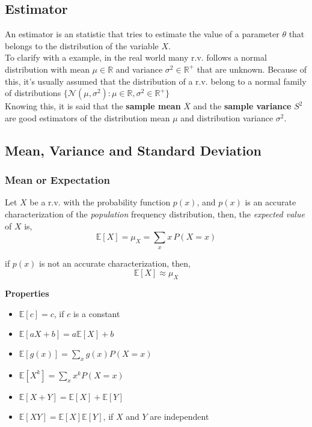 \subsection{Estimator}
An estimator is an statistic that tries to estimate the value of a parameter $\theta$ that belongs to the distribution of the variable
$X$.\\

To clarify with a example, in the real world many r.v. follows a normal distribution with mean $\mu \in \mathbb{R}$ and variance 
$\sigma^2 \in \mathbb{R}^+$ that are unknown. Because of this, it's usually assumed that the distribution of a r.v. belong to a 
normal family of distributions $\{\mathcal{N}(\mu,\sigma^2):\mu\in\mathbb{R},\sigma^2\in \mathbb{R^+} \}$\\

Knowing this, it is said that the \textbf{sample mean} $\overline{X}$ and the \textbf{sample variance} $S^2$ are good estimators of 
the distribution mean $\mu$ and distribution variance $\sigma^2$.

\subsection{Mean, Variance and Standard Deviation}
\subsubsection{Mean or Expectation}
Let $X$ be a r.v. with the probability function $p(x)$, and $p(x)$ is an accurate characterization of the \textit{population} frequency distribution,
then, the \textit{expected value} of $X$ is,
\[ \mathbb{E}[X] = \mu_{X} = \sum_{x} x\,P(X=x) \]

if $p(x)$ is not an accurate characterization, then,
\[ \mathbb{E}[X] \approx \mu_{X} \]

\textbf{Properties}
\begin{itemize}
    \item $\mathbb{E}[c] = c$, if $c$ is a constant
    \item $\mathbb{E}[aX+b]=a\mathbb{E}[X]+b$
    \item $\mathbb{E}[g(x)]=\sum_{x}g(x)P(X=x)$
    \item $\mathbb{E}[X^k] = \sum_{x} x^k P(X=x)$
    \item $\mathbb{E}[X+Y] = \mathbb{E}[X] + \mathbb{E}[Y]$
    \item $\mathbb{E}[XY] = \mathbb{E}[X]\mathbb{E}[Y]$, if $X$ and $Y$ are independent
\end{itemize}

